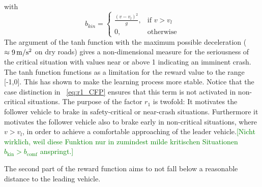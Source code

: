 \documentclass[review]{elsarticle}
\providecommand{\green}[1]{\textcolor{green}{#1}}
\providecommand{\martinc}[1]{\green{[#1]}} %
\providecommand{\sub}[1]{_{\mathrm{#1}}}  %
\providecommand{\3}{{\ss}}
\begin{document}
with
\begin{equation}
\label{bkin}
b_{kin} = 
\begin{cases}
\frac{(v-v_l)^2}{g},& \text{if } v>v_l\\
0,              & \text{otherwise}
\end{cases}
\end{equation}
The argument of the tanh function with  the
maximum possible deceleration ($\approx \unit[9]{m/s^2}$ on dry roads) gives a
non-dimensional measure for the seriousness of the critical situation
with values 
near or above 1 indicating an imminent crash.  The tanh function functions as a limitation for the reward value to the range [-1,0]. This has shown to make the learning process more stable. Notice that the case distinction in ~\eqref{eq:r1_CFP}  ensures that
this term is not activated in non-critical situations. The purpose of
the factor $r_1$ is twofold: It motivates the follower vehicle to
brake in safety-critical or near-crash situations.  Furthermore it
motivates the follower vehicle also to brake early in non-critical
situations, where $ v>v_l$, in order to achieve a comfortable
approaching of the leader vehicle.\martinc{Nicht wirklich, weil diese
  Funktion nur in zumindest milde kritischen Situationen $b\sub{kin}>b\sub{comf}$ anspringt.}

The second part of the reward function aims to not fall below a reasonable
distance to the leading vehicle.
\end{document}
